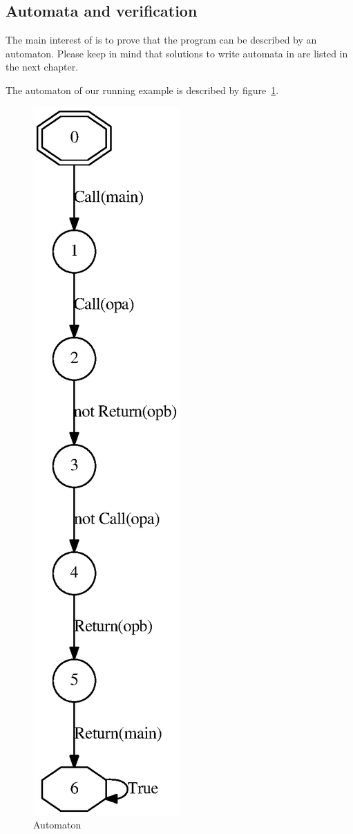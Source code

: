 \documentclass{frama-c-book}
\begin{document}
\subsection{Automata and verification}
The main interest of \aorai is to prove that the program can be
described by an automaton. Please keep in mind that solutions to
write automata in \aorai are listed in the next chapter.

 The automaton of our running example is described by
 figure~\ref{BuchiExample}.

  \begin{figure}[htb]
    \centerline{\includegraphics[height=\textheight]{Schemas/example}}
    \caption{Automaton}
    \label{BuchiExample}
  \end{figure}
\end{document}
